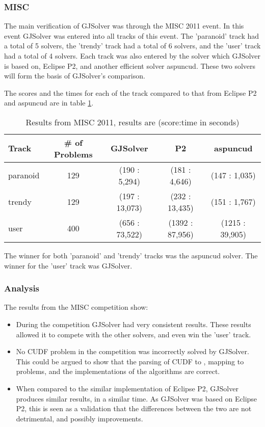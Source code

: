 \subsubsection{MISC}
The main verification of GJSolver was through the MISC 2011 event.
In this event GJSolver was entered into all tracks of this event.
The 'paranoid' track had a total of 5 solvers, the 'trendy' track had a total of 6 solvers, 
and the 'user' track had a total of 4 solvers.
Each track was also entered by the solver which GJSolver is based on, Eclipse P2, and another efficient solver aspuncud.
These two solvers will form the basis of GJSolver's comparison.

The scores and the times for each of the track compared to that from Eclipse P2 and aspuncud are in table \ref{impl.misc2011}.
\begin{table}
\begin{tabular}{| l | c | c | c | c |}\hline
Track & \# of Problems & GJSolver & P2 & aspuncud\\ \hline
paranoid & 129 & (190 : 5,294) & (181 : 4,646) & (147 : 1,035) \\ \hline
trendy & 129 & (197 : 13,073) & (232 : 13,435) & (151 : 1,767) \\ \hline
user & 400 & (656 : 73,522) & (1392 : 87,956) & (1215 : 39,905) \\ \hline
\end{tabular}
\caption{Results from MISC 2011, results are (score:time in seconds)}
\label{impl.misc2011}
\end{table}

The winner for both 'paranoid' and 'trendy' tracks was the aspuncud solver.
The winner for the 'user' track was GJSolver.

\subsubsection{Analysis}
The results from the MISC competition show:
\begin{itemize}
  \item During the competition GJSolver had very consistent results.
These results allowed it to compete with the other solvers, and even win the 'user' track.
 \item No CUDF problem in the competition was incorrectly solved by GJSolver. 
 This could be argued to show that the parsing of CUDF to \modelname, mapping to \modelimpl problems, and the implementations of the algorithms are correct.
 \item When compared to the similar implementation of Eclipse P2, GJSolver produces similar results, in a similar time. 
 As GJSolver was based on Eclipse P2, this is seen as a validation that the differences between the two are not detrimental, and possibly improvements. 
\end{itemize}

